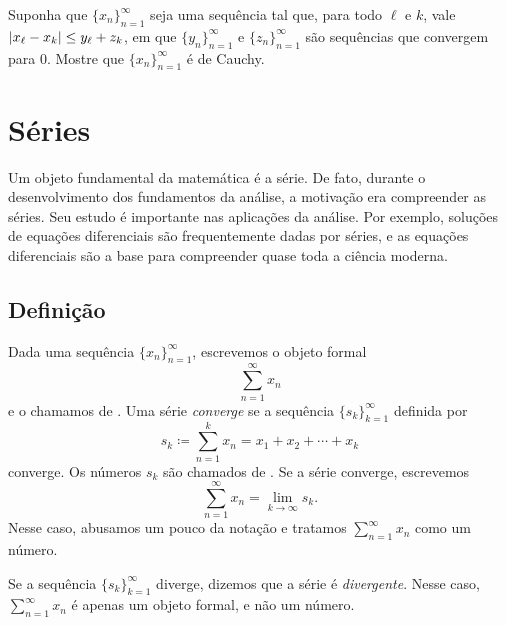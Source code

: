 \begin{exercise}
Suponha que
$\{ x_n \}_{n=1}^\infty$ seja uma sequência tal que, para todo $\ell$ e $k$,
vale
$\lvert {x_\ell-x_k} \rvert \leq y_\ell + z_k$, em que
$\{ y_n \}_{n=1}^\infty$ e
$\{ z_n \}_{n=1}^\infty$ são sequências que convergem para $0$.
Mostre que
$\{ x_n \}_{n=1}^\infty$ é de Cauchy.
\end{exercise}



\sectionnewpage

\section{Séries}
\label{sec:series}



Um objeto fundamental da matemática é a série. De fato, durante o desenvolvimento
dos fundamentos da análise, a motivação era compreender as séries. Seu estudo é
importante nas aplicações da análise. Por exemplo, soluções de equações diferenciais
são frequentemente dadas por séries, e as equações diferenciais são a base para
compreender quase toda a ciência moderna.

\subsection{Definição}

\begin{defn}
Dada uma sequência $\{ x_n \}_{n=1}^\infty$, escrevemos o objeto formal
\begin{equation*}
\sum_{n=1}^\infty x_n
\end{equation*}
e o chamamos de \emph{}. Uma série
\emph{converge} se a sequência
$\{ s_k \}_{k=1}^\infty$
definida por
\begin{equation*}
s_k \coloneqq \sum_{n=1}^k x_n = x_1 + x_2 + \cdots + x_k
\end{equation*}
converge.
Os números $s_k$ são chamados de
\emph{}.
Se a série converge, escrevemos
\begin{equation*}
\sum_{n=1}^\infty x_n =  \lim\limits_{k\to\infty} s_k .
\end{equation*}
Nesse caso, abusamos um pouco da notação e tratamos
$\sum_{n=1}^\infty x_n$ como um número.

Se a sequência $\{ s_k \}_{k=1}^\infty$ diverge,
dizemos que a série é \emph{divergente}.
Nesse caso, $\sum_{n=1}^\infty x_n$ é apenas um objeto formal, e não um número.
\end{defn}

